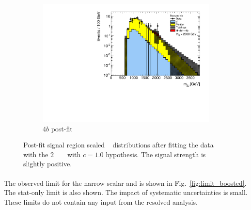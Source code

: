 \begin{figure}[htbp!]
\begin{subfigure}[b]{0.25\textwidth}
        \includegraphics[width=\textwidth,angle=-90]{figures/boosted/results/postfitplot_s_2000_b4b.pdf}
        \caption{$4b$ post-fit}
        \label{fig:postfit4b}
    \end{subfigure}
\caption{Post-fit signal region scaled \mtwoJ~ distributions after fitting the data with the $2$ \TeV~ \Grav~ with $c=1.0$ hypothesis. The signal strength is slightly positive.}
\label{fig:postfit2000}
\end{figure}

\paragraph{}
The observed limit for the narrow scalar and \Grav is shown in Fig.~\ref{fig:limit_boosted}.
The stat-only limit is also shown. The impact of systematic uncertainties is small. 
These limits do not contain any input from the resolved analysis.

